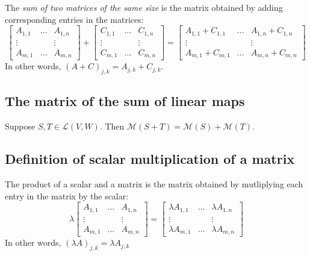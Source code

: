 \documentclass[11pt]{article}
\begin{document}
    The \emph{sum of two matrices of the same size} is the matrix obtained by adding corresponding entries in the matrices:
    \begin{equation*}
        \begin{bmatrix}
            A_{1,1} & \dots & A_{1,n} \\
            \vdots  &       & \vdots  \\
            A_{m,1} & \dots & A_{m,n}
        \end{bmatrix} + \begin{bmatrix}
                            C_{1,1} & \dots & C_{1,n} \\
                            \vdots  &       &  \vdots \\
                            C_{m,1} & \dots & C_{m,n}
                        \end{bmatrix} = \begin{bmatrix}
                                            A_{1,1} + C_{1,1} & \dots & A_{1,n} + C_{1,n} \\
                                            \vdots            &       &   \vdots          \\
                                            A_{m,1} + C_{m,1} & \dots & A_{m,n} + C_{m,n}
                                        \end{bmatrix}
    \end{equation*}
    In other words, \((A+C)_{j,k} = A_{j,k} + C_{j,k}.\)

    \subsection{The matrix of the sum of linear maps}

    Suppose \(S,T \in \mathcal{L}(V,W)\). Then \(\mathcal{M}(S + T) = \mathcal{M}(S) + \mathcal{M}(T)\). 

    \subsection{Definition of scalar multiplication of a matrix}

    The product of a scalar and a matrix is the matrix obtained by mutliplying each entry in the matrix by the scalar:
    \begin{equation*}
        \lambda \begin{bmatrix}
                    A_{1,1} & \dots & A_{1,n} \\
                    \vdots  &       &  \vdots \\
                    A_{m,1} & \dots & A_{m,n}
                \end{bmatrix} = \begin{bmatrix}
                                    \lambda A_{1,1} & \dots & \lambda A_{1,n} \\
                                    \vdots          &       & \vdots \\
                                    \lambda A_{m,1} & \dots & \lambda A_{m,n}
                                \end{bmatrix}
    \end{equation*}
    In other words, \((\lambda A)_{j,k} = \lambda A_{j,k}\)
\end{document}
